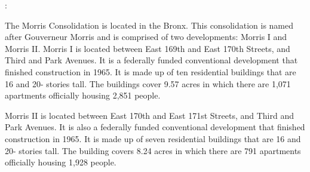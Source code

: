 :     

   

The Morris Consolidation is located in the Bronx. This consolidation is named after Gouverneur Morris and is comprised of two developments: Morris I and Morris II. Morris I is located between East 169th and East 170th Streets, and Third and Park Avenues. It is a federally funded conventional development that finished construction in 1965. It is made up of ten residential buildings that are 16 and 20- stories tall. The buildings cover 9.57 acres in which there are 1,071 apartments officially housing 2,851 people. 

Morris II is located between East 170th and East 171st Streets, and Third and Park Avenues. It is also a federally funded conventional development that finished construction in 1965.  It is made up of seven residential buildings that are 16 and 20- stories tall. The building covers 8.24 acres in which there are 791 apartments officially housing 1,928 people.
